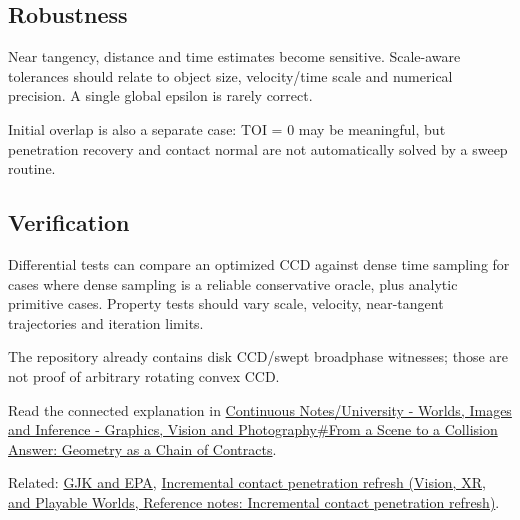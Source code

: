\subsection{Robustness}\label{appendix-66956ed6c753-robustness}

Near tangency, distance and time estimates become sensitive. Scale-aware tolerances should relate to object size, velocity/time scale and numerical precision. A single global epsilon is rarely correct.

Initial overlap is also a separate case: TOI = 0 may be meaningful, but penetration recovery and contact normal are not automatically solved by a sweep routine.

\subsection{Verification}\label{appendix-66956ed6c753-verification}

Differential tests can compare an optimized CCD against dense time sampling for cases where dense sampling is a reliable conservative oracle, plus analytic primitive cases. Property tests should vary scale, velocity, near-tangent trajectories and iteration limits.

The repository already contains disk CCD/swept broadphase witnesses; those are not proof of arbitrary rotating convex CCD.

Read the connected explanation in \hyperref[03-visual-computing-i-ch020-from-a-scene-to-a-collision-answer-geometry-as-a-chain-of-contracts]{Continuous Notes/University - Worlds, Images and Inference - Graphics, Vision and Photography\#From a Scene to a Collision Answer: Geometry as a Chain of Contracts}.

Related: \hyperref[appendix-aef6177f7b3f]{GJK and EPA}, \href{../07-Vision-XR-and-Playable-Worlds/main.pdf\#nameddest=appendix-f682275acbdf}{Incremental contact penetration refresh (Vision, XR, and Playable Worlds, Reference notes: Incremental contact penetration refresh)}.
